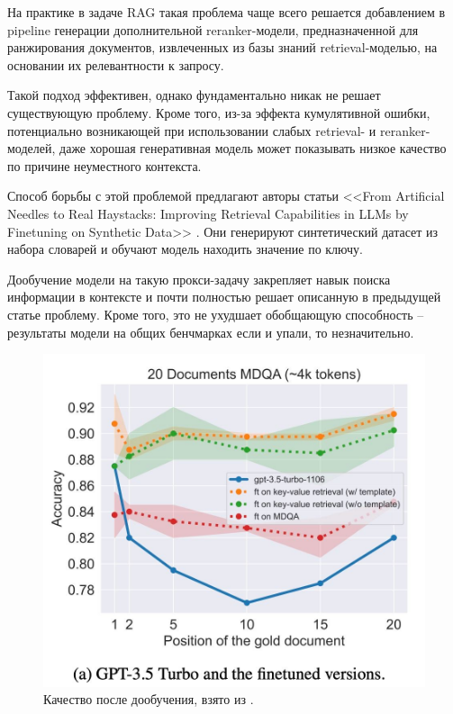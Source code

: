 На практике в задаче RAG такая проблема чаще всего решается добавлением в pipeline генерации дополнительной reranker-модели, предназначенной для ранжирования документов, извлеченных из базы знаний retrieval-моделью, на основании их релевантности к запросу.

Такой подход эффективен, однако фундаментально никак не решает существующую проблему. Кроме того, из-за эффекта кумулятивной ошибки, потенциально возникающей при использовании слабых retrieval- и reranker-моделей, даже хорошая генеративная модель может показывать низкое качество по причине неуместного контекста.

\hfill

Способ борьбы с этой проблемой предлагают авторы статьи <<From Artificial Needles to Real Haystacks: Improving
Retrieval Capabilities in LLMs by Finetuning on
Synthetic Data>> \cite{synth_needle}. Они генерируют синтетический датасет из набора словарей и обучают модель находить значение по ключу. 

Дообучение модели на такую прокси-задачу закрепляет навык поиска информации в контексте и почти полностью решает описанную в предыдущей статье проблему. Кроме того, это не ухудшает обобщающую способность -- результаты модели на общих бенчмарках если и упали, то незначительно.

\begin{figure}[h!]
    \centering
    \includegraphics[scale=0.35]{images/artificial_needle_result.jpg}
    \caption{Качество после дообучения, взято из \cite{synth_needle}.}
\end{figure}

